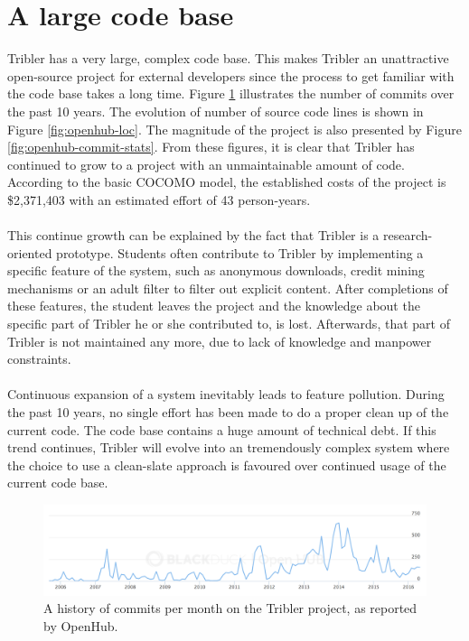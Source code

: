 \section{A large code base}
Tribler has a very large, complex code base. This makes Tribler an unattractive open-source project for external developers since the process to get familiar with the code base takes a long time. Figure \ref{fig:openhub-commits} illustrates the number of commits over the past 10 years. The evolution of number of source code lines is shown in Figure \ref{fig:openhub-loc}. The magnitude of the project is also presented by Figure \ref{fig:openhub-commit-stats}. From these figures, it is clear that Tribler has continued to grow to a project with an unmaintainable amount of code. According to the basic COCOMO\cite{kemerer1987empirical} model, the established costs of the project is \$2,371,403 with an estimated effort of 43 person-years.\\\\
This continue growth can be explained by the fact that Tribler is a research-oriented prototype. Students often contribute to Tribler by implementing a specific feature of the system, such as anonymous downloads, credit mining mechanisms or an adult filter to filter out explicit content. After completions of these features, the student leaves the project and the knowledge about the specific part of Tribler he or she contributed to, is lost. Afterwards, that part of Tribler is not maintained any more, due to lack of knowledge and manpower constraints.\\\\
Continuous expansion of a system inevitably leads to feature pollution. During the past 10 years, no single effort has been made to do a proper clean up of the current code. The code base contains a huge amount of technical debt. If this trend continues, Tribler will evolve into an tremendously complex system where the choice to use a clean-slate approach is favoured over continued usage of the current code base.

\begin{figure}[!h]
	\centering
	\includegraphics[width=\columnwidth]{images/problem_description/openhub_commits}
	\caption{A history of commits per month on the Tribler project, as reported by OpenHub.}
	\label{fig:openhub-commits}
\end{figure}

